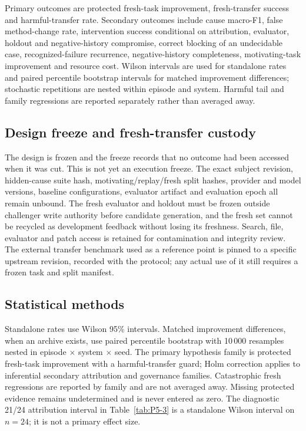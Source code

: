Primary outcomes are protected fresh-task improvement, fresh-transfer success and harmful-transfer rate. Secondary outcomes include cause macro-F1, false method-change rate, intervention success conditional on attribution, evaluator, holdout and negative-history compromise, correct blocking of an undecidable case, recognized-failure recurrence, negative-history completeness, motivating-task improvement and resource cost. Wilson intervals are used for standalone rates and paired percentile bootstrap intervals for matched improvement differences; stochastic repetitions are nested within episode and system. Harmful tail and family regressions are reported separately rather than averaged away.

\subsection{Design freeze and fresh-transfer custody}

The design is frozen and the freeze records that no outcome had been accessed when it was cut. This is not yet an execution freeze. The exact subject revision, hidden-cause suite hash, motivating/replay/fresh split hashes, provider and model versions, baseline configurations, evaluator artifact and evaluation epoch all remain unbound. The fresh evaluator and holdout must be frozen outside challenger write authority before candidate generation, and the fresh set cannot be recycled as development feedback without losing its freshness. Search, file, evaluator and patch access is retained for contamination and integrity review. The external transfer benchmark used as a reference point is pinned to a specific upstream revision, recorded with the protocol; any actual use of it still requires a frozen task and split manifest.

\subsection{Statistical methods}

Standalone rates use Wilson 95\% intervals. Matched improvement differences, when an archive exists, use paired percentile bootstrap with 10\,000 resamples nested in episode $\times$ system $\times$ seed. The primary hypothesis family is protected fresh-task improvement with a harmful-transfer guard; Holm correction applies to inferential secondary attribution and governance families. Catastrophic fresh regressions are reported by family and are not averaged away. Missing protected evidence remains undetermined and is never entered as zero. The diagnostic 21/24 attribution interval in Table~\ref{tab:P5-3} is a standalone Wilson interval on $n=24$; it is not a primary effect size.

